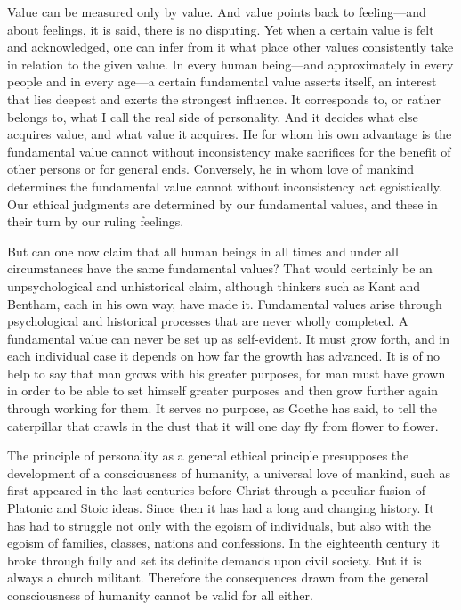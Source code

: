 \documentclass[12pt]{article}
\newcommand{\opage}[1]{\marginnote{\footnotesize\textit{[#1]}}}
\begin{document}
Value can be measured only by value. And value points back to feeling---and
about feelings, it is said, there is no disputing. Yet when a certain value is
felt and acknowledged, one can infer from it what place other values
consistently take in relation to the given value. In every human being---and
approximately in every people and in every age---a certain fundamental value
asserts itself, an interest that lies deepest and exerts the strongest
influence. It corresponds to, or rather belongs to, what I call the real side of
personality. And it decides what else acquires value, and what value it
acquires. He for whom his own advantage is the fundamental value
\opage{52}%
cannot without inconsistency make sacrifices for the benefit of other persons or
for general ends. Conversely, he in whom love of mankind determines the
fundamental value cannot without inconsistency act egoistically. Our ethical
judgments are determined by our fundamental values, and these in their turn by
our ruling feelings.

But can one now claim that all human beings in all times and under all
circumstances have the same fundamental values? That would certainly be an
unpsychological and unhistorical claim, although thinkers such as Kant and
Bentham, each in his own way, have made it. Fundamental values arise through
psychological and historical processes that are never wholly completed. A
fundamental value can never be set up as self-evident. It must grow forth, and
in each individual case it depends on how far the growth has advanced. It is of
no help to say that man grows with his greater purposes, for man must have grown
in order to be able to set himself greater purposes and then grow further again
through working for them. It serves no purpose, as Goethe has said, to tell the
caterpillar that crawls in the dust that it
\opage{53}%
will one day fly from flower to flower.

The principle of personality as a general ethical principle presupposes the
development of a consciousness of humanity, a universal love of mankind, such as
first appeared in the last centuries before Christ through a peculiar fusion of
Platonic and Stoic ideas. Since then it has had a long and changing history. It
has had to struggle not only with the egoism of individuals, but also with the
egoism of families, classes, nations and confessions. In the eighteenth century
it broke through fully and set its definite demands upon civil society. But it
is always a church militant. Therefore the consequences drawn from the general
consciousness of humanity cannot be valid for all either.
\end{document}
